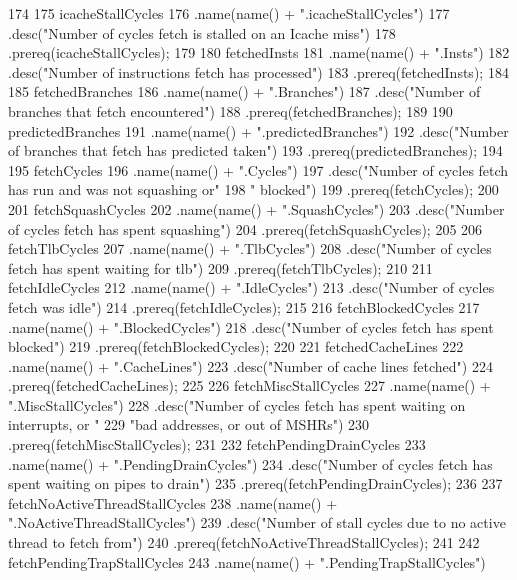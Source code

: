 \begin{DoxyCode}
174 {
175     icacheStallCycles
176         .name(name() + ".icacheStallCycles")
177         .desc("Number of cycles fetch is stalled on an Icache miss")
178         .prereq(icacheStallCycles);
179 
180     fetchedInsts
181         .name(name() + ".Insts")
182         .desc("Number of instructions fetch has processed")
183         .prereq(fetchedInsts);
184 
185     fetchedBranches
186         .name(name() + ".Branches")
187         .desc("Number of branches that fetch encountered")
188         .prereq(fetchedBranches);
189 
190     predictedBranches
191         .name(name() + ".predictedBranches")
192         .desc("Number of branches that fetch has predicted taken")
193         .prereq(predictedBranches);
194 
195     fetchCycles
196         .name(name() + ".Cycles")
197         .desc("Number of cycles fetch has run and was not squashing or"
198               " blocked")
199         .prereq(fetchCycles);
200 
201     fetchSquashCycles
202         .name(name() + ".SquashCycles")
203         .desc("Number of cycles fetch has spent squashing")
204         .prereq(fetchSquashCycles);
205 
206     fetchTlbCycles
207         .name(name() + ".TlbCycles")
208         .desc("Number of cycles fetch has spent waiting for tlb")
209         .prereq(fetchTlbCycles);
210 
211     fetchIdleCycles
212         .name(name() + ".IdleCycles")
213         .desc("Number of cycles fetch was idle")
214         .prereq(fetchIdleCycles);
215 
216     fetchBlockedCycles
217         .name(name() + ".BlockedCycles")
218         .desc("Number of cycles fetch has spent blocked")
219         .prereq(fetchBlockedCycles);
220 
221     fetchedCacheLines
222         .name(name() + ".CacheLines")
223         .desc("Number of cache lines fetched")
224         .prereq(fetchedCacheLines);
225 
226     fetchMiscStallCycles
227         .name(name() + ".MiscStallCycles")
228         .desc("Number of cycles fetch has spent waiting on interrupts, or "
229               "bad addresses, or out of MSHRs")
230         .prereq(fetchMiscStallCycles);
231 
232     fetchPendingDrainCycles
233         .name(name() + ".PendingDrainCycles")
234         .desc("Number of cycles fetch has spent waiting on pipes to drain")
235         .prereq(fetchPendingDrainCycles);
236 
237     fetchNoActiveThreadStallCycles
238         .name(name() + ".NoActiveThreadStallCycles")
239         .desc("Number of stall cycles due to no active thread to fetch from")
240         .prereq(fetchNoActiveThreadStallCycles);
241 
242     fetchPendingTrapStallCycles
243         .name(name() + ".PendingTrapStallCycles")
}
\end{DoxyCode}
